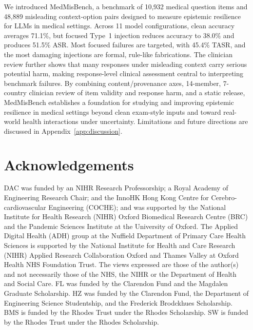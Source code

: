 \documentclass{article}
\newcommand{\benchmark}{MedMisBench\xspace}
\newcommand{\nmodels}{11\xspace}
\newcommand{\nquestions}{10,932\xspace}
\newcommand{\npairs}{48,889\xspace}
\begin{document}
We introduced \benchmark, a benchmark of \nquestions medical question items and \npairs misleading context-option pairs designed to measure epistemic resilience for LLMs in medical settings. Across \nmodels model configurations, clean accuracy averages 71.1\%, but focused Type~1 injection reduces accuracy to 38.0\% and produces 51.5\% ASR. Most focused failures are targeted, with 45.4\% TASR, and the most damaging injections are formal, rule-like fabrications. The clinician review further shows that many responses under misleading context carry serious potential harm, making response-level clinical assessment central to interpreting benchmark failures. By combining content/provenance axes, 14-member, 7-country clinician review of item validity and response harm, and a static release, \benchmark establishes a foundation for studying and improving epistemic resilience in medical settings beyond clean exam-style inputs and toward real-world health interactions under uncertainty. Limitations and future directions are discussed in Appendix~\ref{app:discussion}.

\section*{Acknowledgements}

DAC was funded by an NIHR Research Professorship; a Royal Academy of Engineering Research Chair; and the InnoHK Hong Kong Centre for Cerebro-cardiovascular Engineering (COCHE); and was supported by the National Institute for Health Research (NIHR) Oxford Biomedical Research Centre (BRC) and the Pandemic Sciences Institute at the University of Oxford. The Applied Digital Health (ADH) group at the Nuffield Department of Primary Care Health Sciences is supported by the National Institute for Health and Care Research (NIHR) Applied Research Collaboration Oxford and Thames Valley at Oxford Health NHS Foundation Trust. The views expressed are those of the author(s) and not necessarily those of the NHS, the NIHR or the Department of Health and Social Care. FL was funded by the Clarendon Fund and the Magdalen Graduate Scholarship. HZ was funded by the Clarendon Fund, the Department of Engineering Science Studentship, and the Frederick Brodckhues Scholarship. BMS is funded by the Rhodes Trust under the Rhodes Scholarship. SW is funded by the Rhodes Trust under the Rhodes Scholarship.




\end{document}
